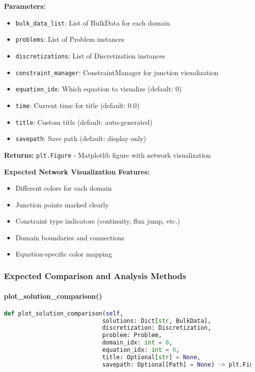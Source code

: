 \textbf{Parameters:}
\begin{itemize}
    \item \texttt{bulk\_data\_list}: List of BulkData for each domain
    \item \texttt{problems}: List of Problem instances
    \item \texttt{discretizations}: List of Discretization instances
    \item \texttt{constraint\_manager}: ConstraintManager for junction visualization
    \item \texttt{equation\_idx}: Which equation to visualize (default: 0)
    \item \texttt{time}: Current time for title (default: 0.0)
    \item \texttt{title}: Custom title (default: auto-generated)
    \item \texttt{savepath}: Save path (default: display only)
\end{itemize}

\textbf{Returns:} \texttt{plt.Figure} - Matplotlib figure with network visualization

\textbf{Expected Network Visualization Features:}
\begin{itemize}
    \item Different colors for each domain
    \item Junction points marked clearly
    \item Constraint type indicators (continuity, flux jump, etc.)
    \item Domain boundaries and connections
    \item Equation-specific color mapping
\end{itemize}

\subsubsection{Expected Comparison and Analysis Methods}

\paragraph{plot\_solution\_comparison()}\leavevmode
\begin{lstlisting}[language=Python, caption=Expected Solution Comparison Method]
def plot_solution_comparison(self,
                            solutions: Dict[str, BulkData],
                            discretization: Discretization,
                            problem: Problem,
                            domain_idx: int = 0,
                            equation_idx: int = 0,
                            title: Optional[str] = None,
                            savepath: Optional[Path] = None) -> plt.Figure
\end{lstlisting}

